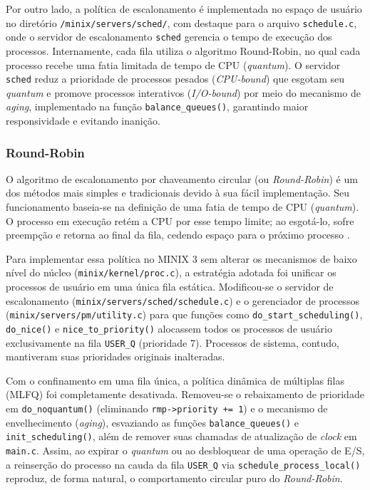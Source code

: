 \documentclass[12pt]{article}
\begin{document}
Por outro lado, a política de escalonamento é implementada no espaço de usuário no diretório \texttt{/minix/servers/sched/}, com destaque para o arquivo \texttt{schedule.c}, onde o servidor de escalonamento \texttt{sched} gerencia o tempo de execução dos processos. Internamente, cada fila utiliza o algoritmo Round-Robin, no qual cada processo recebe uma fatia limitada de tempo de CPU (\textit{quantum}). O servidor \texttt{sched} reduz a prioridade de processos pesados (\textit{CPU-bound}) que esgotam seu \textit{quantum} e promove processos interativos (\textit{I/O-bound}) por meio do mecanismo de \textit{aging}, implementado na função \texttt{balance\_queues()}, garantindo maior responsividade e evitando inanição.
\vspace{-10pt}
\subsubsection{Round-Robin}
\vspace{-10pt}
O algoritmo de escalonamento por chaveamento circular (ou \textit{Round-Robin}) é um dos métodos mais simples e tradicionais devido à sua fácil implementação. Seu funcionamento baseia-se na definição de uma fatia de tempo de CPU (\textit{quantum}). O processo em execução retém a CPU por esse tempo limite; ao esgotá-lo, sofre preempção e retorna ao final da fila, cedendo espaço para o próximo processo \cite[p. 109--110]{tanenbaum}.

Para implementar essa política no MINIX 3 sem alterar os mecanismos de baixo nível do núcleo (\texttt{minix/kernel/proc.c}), a estratégia adotada foi unificar os processos de usuário em uma única fila estática. Modificou-se o servidor de escalonamento (\texttt{minix/servers/sched/schedule.c}) e o gerenciador de processos (\texttt{minix/servers/pm/utility.c}) para que funções como \texttt{do\_start\_scheduling()}, \texttt{do\_nice()} e \texttt{nice\_to\_priority()} alocassem todos os processos de usuário exclusivamente na fila \texttt{USER\_Q} (prioridade 7). Processos de sistema, contudo, mantiveram suas prioridades originais inalteradas.

Com o confinamento em uma fila única, a política dinâmica de múltiplas filas (MLFQ) foi completamente desativada. Removeu-se o rebaixamento de prioridade em \texttt{do\_noquantum()} (eliminando \texttt{rmp->priority += 1}) e o mecanismo de envelhecimento (\textit{aging}), esvaziando as funções \texttt{balance\_queues()} e \texttt{init\_scheduling()}, além de remover suas chamadas de atualização de \textit{clock} em \texttt{main.c}. Assim, ao expirar o \textit{quantum} ou ao desbloquear de uma operação de E/S, a reinserção do processo na cauda da fila \texttt{USER\_Q} via \texttt{schedule\_process\_local()} reproduz, de forma natural, o comportamento circular puro do \textit{Round-Robin}.
\end{document}
